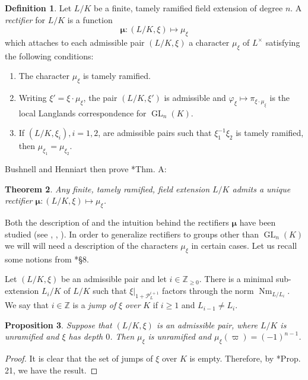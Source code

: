 \documentclass{amsart}
\theoremstyle{plain}
\newtheorem{theorem}{Theorem}[section]
\newtheorem{proposition}[theorem]{Proposition}
\theoremstyle{definition}
\newtheorem{definition}[theorem]{Definition}
\numberwithin{equation}{section}
\DeclareMathOperator{\Nm}{Nm}
\DeclareMathOperator{\GL}{GL}
\newcommand{\PL}{\mathcal{P}_L}
\newcommand{\ZZ}{\mathbb{Z}}
\newcommand{\bmu}{\boldsymbol\mu}
\begin{document}
\begin{definition}\label{rectifierbushnellhenniart}
Let $L/K$ be a finite, tamely ramified field extension of degree $n$.  A \emph{rectifier}
for $L/K$ is a function
$$\bmu : (L/K, \xi) \mapsto \mu_{\xi}$$
which attaches to each admissible pair $(L/K, \xi)$ a character $\mu_{\xi}$ of $L^{\times}$
satisfying the following conditions:
\begin{enumerate}
\item The character $\mu_{\xi}$ is tamely ramified.
\item Writing $\xi' = \xi \cdot \mu_{\xi}$, the pair $(L/K, \xi')$ is admissible and
$\varphi_{\xi} \mapsto \pi_{\xi \cdot \mu_{\xi}}$ is the local Langlands correspondence
for $\GL_n(K)$.
\item If $(L/K, \xi_i), i = 1,2$, are admissible pairs such that $\xi_1^{-1} \xi_2$ is
tamely ramified, then $ \mu_{\xi_1} =  \mu_{\xi_2}$.
\end{enumerate}
\end{definition}

Bushnell and Henniart then prove \cite{bushnell-henniart:10a}*{Thm. A}:

\begin{theorem}
Any finite, tamely ramified, field extension $L/K$ admits a unique rectifier
$\bmu : (L/K, \xi) \mapsto \mu_{\xi}$.
\end{theorem}

Both the description of and the
intuition behind the rectifiers $\bmu$ have been
studied (see \cite{bushnell-henniart:10a}, \cite{tam:12a}, \cite{adrian:13a}).  In order to
generalize rectifiers to groups other than $\GL_n(K)$ we
will will need a description of the characters $\mu_{\xi}$ in certain cases.
Let us recall some notions from \cite{bushnell-henniart:10a}*{\S 8}.

Let $(L/K,\xi)$ be an admissible pair and let $i \in \ZZ_{\ge 0}$.
There is a minimal sub-extension $L_i/K$ of $L/K$ such that
$\xi|_{1 + \PL^{i+1}}$ factors through the norm $\Nm_{L/L_i}$.  We say that $i \in \mathbb{Z}$
is a \emph{jump of} $\xi$ \emph{over} $K$ if $i \geq 1$ and $L_{i-1} \neq L_i$.

\begin{proposition}\label{prop:BH_result1}
  Suppose that $(L/K, \xi)$ is an admissible pair, where $L/K$
  is unramified and $\xi$ has depth $0$.
  Then $\mu_{\xi}$ is unramified and
  $\mu_{\xi}(\varpi) = (-1)^{n-1}$.
\end{proposition}

\begin{proof}
It is clear that the set of jumps of $\xi$ over $K$ is empty.
Therefore, by \cite{bushnell-henniart:10a}*{Prop. 21}, we have the result.
\end{proof}
\end{document}
